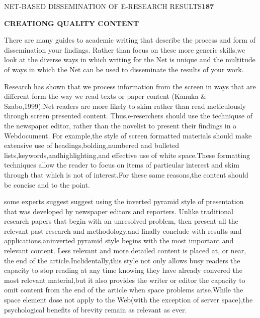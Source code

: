 \documentclass[10pt,a4paper]{book}
\begin{document}
\small

\begin{flushright}
NET-BASED DISSEMINATION OF E-RESEARCH RESULTS\quad \textbf{187}
\end{flushright}

\begin{flushleft}
\normalsize
\textbf{CREATIONG QUALITY CONTENT}
\end{flushleft}


There are many guides to academic writing that describe the process and form of dissemination your findings. Rather than focus on these more generic skills,we look at the diverse ways in which writing for the Net is unique and the multitude of ways in which the Net can be used to disseminate the results of your work.

Research has shown that we process information from the screen in ways that are different form the way we read texts or paper content (Kanuka $\&$ Szabo,1999).Net readers are more likely to skim rather than read meticulously through screen presented content. Thus,e-reserchers should use the techniquse of the newspaper editor, rather than the novelist to present their findings in a Webdocument. For example,the style of screen formatted materials should make extensive use of headings,bolding,numbered and bulleted lists,keywords,andhighlighting,and effective use of white space.These formatting techniques allow the reader to focus on items of partieular interest and skim through that which is not of interest.For these same reasons,the content should be concise and to the point.

some experts suggest suggest using the inverted pyramid style of presentation that was developed by newspaper editors and reporters. Unlike traditional research papers that begin with an unresolved problem, then present all the relevant past research and methodology,and finally conclude with results and applications,aninverted pyramid style begins with the most important and relevant content. Less relevant and more detailed content is placed at, or near, the end of the article.Inclidentally,this style not only allows busy readers the capacity to stop reading at any time knowing they have already convered the most relevant material,but it also provides the writer or editor the capacity to omit content from the end of the article when space problems arise.While the space element dose not apply to the Web(with the exception of server space),the psychological benefits of brevity remain as relevant as ever.
\end{document}
